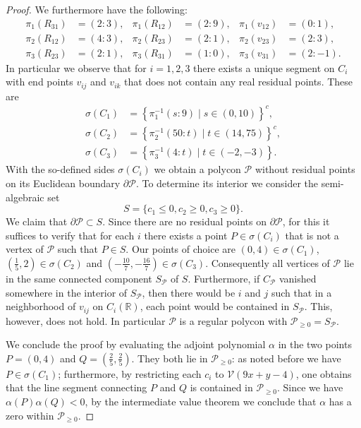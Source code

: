 \documentclass[a4paper,10pt]{amsart}
\theoremstyle{definition}
\theoremstyle{plain}
\newcommand{\cP}{{\mathcal P}}
\newcommand{\cV}{{\mathcal V}}
\newcommand{\R}{{\mathbb R}}
\begin{document}
\begin{proof}
We furthermore have the following:
\begin{align*}
    \pi_1(R_{31}) &= (2 : 3), & \pi_1(R_{12}) &= (2 : 9), & \pi_1(v_{12}) &= (0 : 1), \\
    \pi_2(R_{12}) &= (4 : 3), & \pi_2(R_{23}) &= (2 : 1), & \pi_2(v_{23}) &= (2 : 3), \\
    \pi_3(R_{23}) &= (2 : 1), & \pi_3(R_{31}) &= (1 : 0), & \pi_3(v_{31}) &= (2 : -1).
\end{align*}
In particular we observe that for $i=1,2,3$ there exists a unique segment on $C_i$ with end points $v_{ij}$ and $v_{ik}$ that does not contain any real residual points. These are
\begin{equation*}
\begin{split}
    \sigma(C_1) &= \left\lbrace \pi_1^{-1}(s : 9) \mid s \in (0,10) \right\rbrace^c, \\
    \sigma(C_2) &= \left\lbrace \pi_2^{-1}(50 : t) \mid t \in (14,75) \right\rbrace^c, \\
    \sigma(C_3) &= \left\lbrace \pi_3^{-1}(4 : t) \mid t \in (-2,-3) \right\rbrace.
\end{split}
\end{equation*}
With the so-defined sides $\sigma(C_i)$ we obtain a polycon $\cP$ without residual points on its Euclidean boundary $\partial \cP$. To determine its interior we consider the semi-algebraic set
 \begin{equation*}
     S = \{ c_1 \leq 0, c_2 \geq 0, c_3 \geq 0 \}.
 \end{equation*}
 We claim that $\partial\cP \subset S$. Since there are no residual points on $\partial \cP$, for this it suffices to verify that for each $i$ there exists a point $P \in \sigma(C_i)$ that is not a vertex of $\cP$ such that $P \in S$. Our points of choice are $(0,4) \in \sigma(C_1)$, $\left(\frac{1}{5},2\right) \in \sigma(C_2)$ and $\left(-\frac{10}{7},-\frac{16}{7}\right) \in \sigma(C_3)$. Consequently all vertices of $\cP$ lie in the same connected component $S_\cP$ of $S$. Furthermore, if $C_\cP$ vanished somewhere in the interior of $S_\cP$, then there would be $i$ and $j$ such that in a neighborhood of $v_{ij}$ on $C_i(\R)$, each point would be contained in $S_\cP$. This, however, does not hold. In particular $\cP$ is a regular polycon with $\cP_{\geq0} = S_\cP$.
 
 We conclude the proof by evaluating the adjoint polynomial $\alpha$ in the two points $P = (0,4)$ and $Q = \left(\frac{2}{5}, \frac{2}{5}\right)$. They both lie in $\cP_{\geq0}$: as noted before we have $P \in \sigma(C_1)$; furthermore, by restricting each $c_i$ to $\cV(9x+y-4)$, one obtains that the line segment connecting $P$ and $Q$ is contained in $\cP_{\geq0}$. Since we have $\alpha(P) \alpha(Q) < 0$, by the intermediate value theorem we conclude that $\alpha$ has a zero within $\cP_{\geq0}$.
\end{proof}
\end{document}
